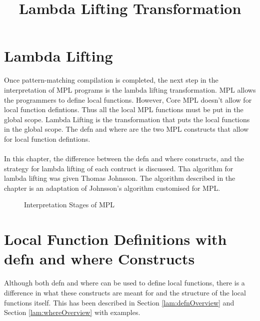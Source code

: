 \documentclass[11pt]{article}
\title{Lambda Lifting Transformation}
\begin{document}
\maketitle
\section {Lambda Lifting} 
Once pattern-matching compilation is completed, the next step in the interpretation of MPL programs is the lambda lifting transformation. MPL allows the programmers to define local functions. However, Core MPL doesn't allow for local function defintions. Thus all the local MPL functions must be put in the global scope. Lambda Lifting is the transformation that puts the local functions in the global scope. The {\sf defn} and {\sf where} are the two MPL constructs that allow for local function defintions. 
~~\\~~\\ 
In this chapter, the difference between the {\sf defn} and {\sf where} constructs, and the strategy for lambda lifting of each contruct is discussed. Tha algorithm for lambda lifting was given Thomas Johnsson. The algorithm described in the chapter is an adaptation of Johnsson's algorithm customised for MPL.
\begin{figure}[h!]
\begin {center}
\caption{Interpretation Stages of MPL} \label{fig:CSAM}
\end{center}
\end{figure}



\section {Local Function Definitions with defn and where Constructs}
Although both {\sf defn} and {\sf where} can be used to define local functions, there is a difference in what these constructs are meant for and the structure of the local functions itself. This has been described in Section \ref {lam:defnOverview} and Section \ref {lam:whereOverview} with examples.
\end{document}
